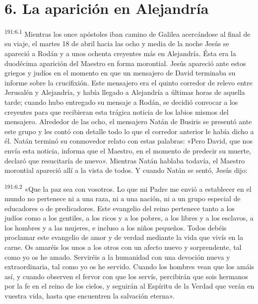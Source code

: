 \section*{6. La aparición en Alejandría}
\par 
\textsuperscript{191:6.1} Mientras los once apóstoles iban camino de Galilea acercándose al final de su viaje, el martes 18 de abril hacia las ocho y media de la noche Jesús se apareció a Rodán y a unos ochenta creyentes más en Alejandría. Ésta era la duodécima aparición del Maestro en forma morontial. Jesús apareció ante estos griegos y judíos en el momento en que un mensajero de David terminaba su informe sobre la crucifixión. Este mensajero era el quinto corredor de relevo entre Jerusalén y Alejandría, y había llegado a Alejandría a últimas horas de aquella tarde; cuando hubo entregado su mensaje a Rodán, se decidió convocar a los creyentes para que recibieran esta trágica noticia de los labios mismos del mensajero. Alrededor de las ocho, el mensajero Natán de Busiris se presentó ante este grupo y les contó con detalle todo lo que el corredor anterior le había dicho a él. Natán terminó su conmovedor relato con estas palabras: «Pero David, que nos envía esta noticia, informa que el Maestro, en el momento de predecir su muerte, declaró que resucitaría de nuevo». Mientras Natán hablaba todavía, el Maestro morontial apareció allí a la vista de todos. Y cuando Natán se sentó, Jesús dijo:

\par 
\textsuperscript{191:6.2} «Que la paz sea con vosotros. Lo que mi Padre me envió a establecer en el mundo no pertenece ni a una raza, ni a una nación, ni a un grupo especial de educadores o de predicadores. Este evangelio del reino pertenece tanto a los judíos como a los gentiles, a los ricos y a los pobres, a los libres y a los esclavos, a los hombres y a las mujeres, e incluso a los niños pequeños. Todos debéis proclamar este evangelio de amor y de verdad mediante la vida que vivís en la carne. Os amaréis los unos a los otros con un afecto nuevo y sorprendente, tal como yo os he amado. Serviréis a la humanidad con una devoción nueva y extraordinaria, tal como yo os he servido. Cuando los hombres vean que los amáis así, y cuando observen el fervor con que los servís, percibirán que sois hermanos por la fe en el reino de los cielos, y seguirán al Espíritu de la Verdad que verán en vuestra vida, hasta que encuentren la salvación eterna».

